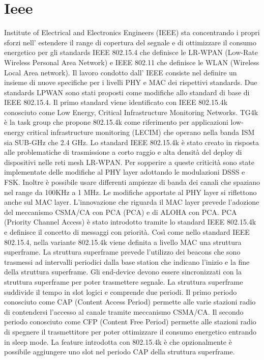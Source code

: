 \documentclass[12pt,a4paper,openright,twoside]{report}
\begin{document}
\section{Ieee} 
Institute of Electrical and Electronics Engineers (IEEE) sta concentrando i propri sforzi nell' estendere il range di copertura del segnale e di ottimizzare il consumo energetico per gli standards IEEE 802.15.4 che definisce le LR-WPAN (Low-Rate Wireless Personal Area Network) e IEEE 802.11 che definisce le WLAN (Wireless Local Area network). 
Il lavoro condotto dall' IEEE consiste nel definire un insieme di nuove specifiche per i livelli PHY e MAC dei rispettivi standards.
Due standards LPWAN sono stati proposti come modifiche allo standard di base di IEEE 802.15.4. 
Il primo standard viene identificato con IEEE 802.15.4k conosciuto come Low Energy, Critical Infrastructure Monitoring Networks. 
TG4k \`e la task group che propone 802.15.4k come riferimento per applicazioni low-energy critical infrastructure monitoring (LECIM) che operano nella banda ISM sia SUB-GHz che 2.4 GHz.       
Lo standard IEEE 802.15.4k \`e stato creato in risposta alle problematiche di trasmissione a corto raggio e alta densit\`a del deploy di dispositivi nelle reti mesh LR-WPAN.
Per sopperire a queste criticit\`a sono state implementate delle modifiche al PHY layer adottando le modulazioni DSSS e FSK. Inoltre \`e possibile usare differenti ampiezze di banda dei canali che spaziano nel range da 100KHz a 1 MHz. 
Le modifiche apportate al PHY layer si riflettono anche sul MAC layer.
L'innovazione che riguarda il MAC layer prevede l'adozione del meccanismo CSMA/CA con PCA (PCA) e di ALOHA con PCA. 
PCA (Priority Channel Access) \`e stato introdotto tramite lo standard IEEE 802.15.4k e definisce il concetto di messaggi con priorit\`a. 
Cos\`i come nello standard IEEE 802.15.4, nella variante 802.15.4k viene definita a livello MAC una struttura superframe. La struttura superframe prevede l'utilizzo dei beacons che sono trasmessi ad intervalli periodici dalla base station che indicano l'inizio e la fine della struttura superframe. Gli end-device devono essere sincronizzati con la struttura superframe per poter trasmettere segnale. La struttura superframe suddivide il tempo in slot logici e comprende due periodi. Il primo periodo conosciuto come CAP (Content Access Period) permette alle varie stazioni radio di contendersi l'accesso al canale tramite meccanismo CSMA/CA. Il secondo periodo conosciuto come CFP (Content Free Period) permette alle stazioni radio di spegnere il trasmettitore per poter ottimizzare il consumo energetico entrando in sleep mode. La feature introdotta con 802.15.4k \`e che opzionalmente \`e possibile aggiungere uno slot nel periodo CAP della struttura superframe. 
\end{document}
